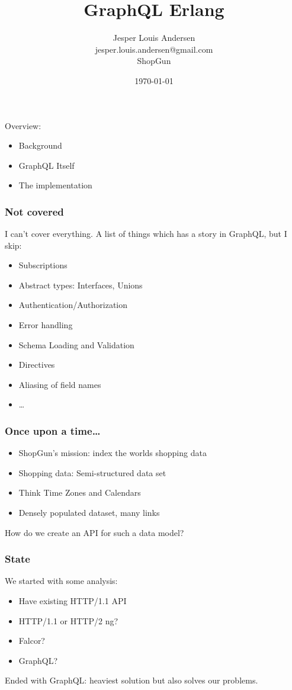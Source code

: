 \documentclass[lualatex]{beamer}
\author{Jesper Louis
  Andersen\\jesper.louis.andersen@gmail.com\\ShopGun}
\date{\today{}}
\title{GraphQL Erlang}
\begin{document}
\maketitle

\begin{frame}
  Overview:
  \begin{itemize}
  \item Background
  \item GraphQL Itself
  \item The implementation
  \end{itemize}
\end{frame}

\begin{frame}
  \frametitle{Not covered}
  I can't cover everything. A list of things which has a story in
  GraphQL, but I skip:
  \begin{itemize}
  \item Subscriptions
  \item Abstract types: Interfaces, Unions
  \item Authentication/Authorization
  \item Error handling
  \item Schema Loading and Validation
  \item Directives
  \item Aliasing of field names
  \item \ldots{}
  \end{itemize}
\end{frame}

\begin{frame}
  \frametitle{Once upon a time\ldots{}}
  \begin{itemize}
  \item ShopGun's mission: index the worlds shopping data
  \item Shopping data: Semi-structured data set
  \item Think Time Zones and Calendars
  \item Densely populated dataset, many links
  \end{itemize}

  How do we create an API for such a data model?
\end{frame}

\begin{frame}
  \frametitle{State}
  We started with some analysis:
  \begin{itemize}
  \item Have existing HTTP/1.1 API
  \item HTTP/1.1 or HTTP/2 ng?
  \item Falcor?
  \item GraphQL?
  \end{itemize}

  Ended with GraphQL: heaviest solution but also solves our problems.
\end{frame}
\end{document}
